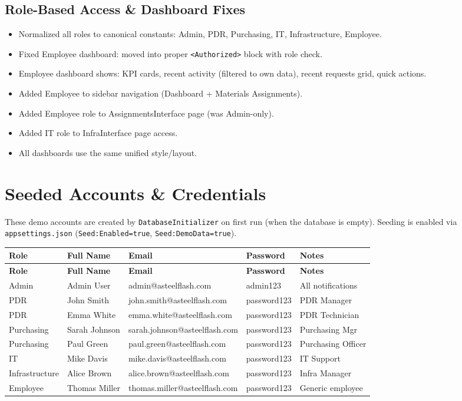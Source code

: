 \documentclass[11pt,a4paper]{article}
\begin{document}
\subsection{Role-Based Access \& Dashboard Fixes}
\begin{itemize}
  \item Normalized all roles to canonical constants: Admin, PDR, Purchasing, IT, Infrastructure, Employee.
  \item Fixed Employee dashboard: moved into proper \texttt{<Authorized>} block with role check.
  \item Employee dashboard shows: KPI cards, recent activity (filtered to own data), recent requests grid, quick actions.
  \item Added Employee to sidebar navigation (Dashboard + Materials Assignments).
  \item Added Employee role to AssignmentsInterface page (was Admin-only).
  \item Added IT role to InfraInterface page access.
  \item All dashboards use the same unified style/layout.
\end{itemize}

\section{Seeded Accounts \& Credentials}

These demo accounts are created by \texttt{DatabaseInitializer} on first run (when the database is empty). Seeding is enabled via \texttt{appsettings.json} (\texttt{Seed:Enabled=true}, \texttt{Seed:DemoData=true}).

\begin{longtable}{| l | l | l | l | l |}
\hline
\textbf{Role} & \textbf{Full Name} & \textbf{Email} & \textbf{Password} & \textbf{Notes} \\
\hline
\endfirsthead
\hline
\textbf{Role} & \textbf{Full Name} & \textbf{Email} & \textbf{Password} & \textbf{Notes} \\
\hline
\endhead
Admin & Admin User & admin@asteelflash.com & admin123 & All notifications \\
\hline
PDR & John Smith & john.smith@asteelflash.com & password123 & PDR Manager \\
\hline
PDR & Emma White & emma.white@asteelflash.com & password123 & PDR Technician \\
\hline
Purchasing & Sarah Johnson & sarah.johnson@asteelflash.com & password123 & Purchasing Mgr \\
\hline
Purchasing & Paul Green & paul.green@asteelflash.com & password123 & Purchasing Officer \\
\hline
IT & Mike Davis & mike.davis@asteelflash.com & password123 & IT Support \\
\hline
Infrastructure & Alice Brown & alice.brown@asteelflash.com & password123 & Infra Manager \\
\hline
Employee & Thomas Miller & thomas.miller@asteelflash.com & password123 & Generic employee \\
\hline
\end{longtable}
\end{document}
